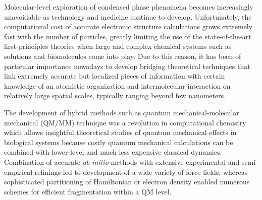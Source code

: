 \documentclass[aip,jcp,preprint,amsmath,amssymb,floatfix]{revtex4-1}
\begin{document}
Molecular\hyp{}level exploration of condensed phase phenomena becomes increasingly unavoidable
as technology and medicine continue to develop. Unfortunately, the computational cost of accurate
electronic structure calculations grows extremely fast with the number of particles, greatly limiting
the use of the state\hyp{}of\hyp{}the\hyp{}art first\hyp{}principles theories when large and complex 
chemical systems such as solutions and biomolecules come into play.\cite{
Xu.Guidez.Bertoni.Gordon.JCP.2018,Tomasi.Mennucci.Cammi.ChemRev.2005}
Due to this reason, it has been of particular importance nowadays to develop bridging theoretical techniques 
that link extremely accurate but localized pieces of information with certain knowledge of an atomistic 
organization and intermolecular interaction on relatively large spatial scales, typically ranging beyond 
few nanometers. 

The development of hybrid methods such as quantum mechanical\hyp{}molecular mechanical (QM/MM) technique 
was a revolution in computational chemistry which allows insightful theoretical studies of quantum mechanical
effects in biological systems because costly quantum mechanical calculations can be combined with lower\hyp{}level 
and much less expensive classical dynamics.\cite{Warshel.Levitt.JMolBiol.1976,Senn.Thiel.Angew.2009}
Combination of accurate \emph{ab initio} methods with extensive experimental and semi\hyp{}empirical
refinings led to development of a wide variety of force fields,\cite{Demerdash.Yap.T-Head-Gordon.AnnuRevPhysChem.2014}
whereas sophisticated partitioning of Hamiltonian or electron density enabled numerous schemes for efficient fragmentation
within a QM level.\cite{Gordon.Fedorov.Pruitt.Slipchenko.ChemRev.2012}
\end{document}
